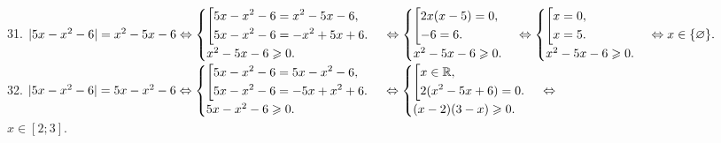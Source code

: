 \documentclass[12pt]{article}
\begin{document}
31. $|5x-x^2-6|=x^2-5x-6 \Leftrightarrow \begin{cases}\left[
      \begin{gathered} 5x-x^2-6=x^2-5x-6,\hfill\\
      5x-x^2-6=-x^2+5x+6.\hfill \end{gathered}\right.\\
x^2-5x-6\geqslant0.\end{cases}\Leftrightarrow \begin{cases}\left[
      \begin{gathered} 2x(x-5)=0,\hfill\\
      -6=6.\hfill \end{gathered}\right.\\
x^2-5x-6\geqslant0.\end{cases}\Leftrightarrow \begin{cases}\left[
      \begin{gathered} x=0,\hfill\\
      x=5.\hfill \end{gathered}\right.\\
x^2-5x-6\geqslant0.\end{cases}\Leftrightarrow x\in\{\varnothing\}.$\\
32. $|5x-x^2-6|=5x-x^2-6\Leftrightarrow \begin{cases}\left[
      \begin{gathered} 5x-x^2-6=5x-x^2-6,\hfill\\
      5x-x^2-6=-5x+x^2+6.\hfill \end{gathered}\right.\\
5x-x^2-6\geqslant0.\end{cases}\Leftrightarrow \begin{cases}\left[
      \begin{gathered} x\in\mathbb{R},\hfill\\
      2(x^2-5x+6)=0.\hfill \end{gathered}\right.\\
(x-2)(3-x)\geqslant0.\end{cases}\Leftrightarrow$\\$ x\in[2;3].$\\
\end{document}
